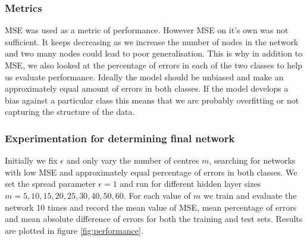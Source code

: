 \documentclass[a4paper, 11pt]{article}
\begin{document}
\subsubsection{Metrics}
MSE was used as a metric of performance. However MSE on it's own was not sufficient. It keeps decreasing as we increase the number of nodes in the network and two many nodes could lead to poor generalisation. This is why in addition to MSE, we also looked at the percentage of errors in each of the two classes to help us evaluate performance. Ideally the model should be unbiased and make an approximately equal amount of errors in both classes. If the model develops a bias against a particular class this means that we are probably overfitting or not capturing the structure of the data.



\subsubsection{Experimentation for determining final network}
Initially we fix $\epsilon$ and only vary the number of centres $m$, searching for networks with low MSE and approximately equal percentage of errors in both classes. We set the spread parameter $\epsilon = 1$ and run for different hidden layer sizes $m = 5, 10, 15, 20, 25, 30, 40, 50, 60$. For each value of $m$ we train and evaluate the network 10 times and record the mean value of MSE, mean percentage of errors and mean absolute difference of errors for both the training and test sets. Results are plotted in figure \ref{fig:performance}.
\end{document}
